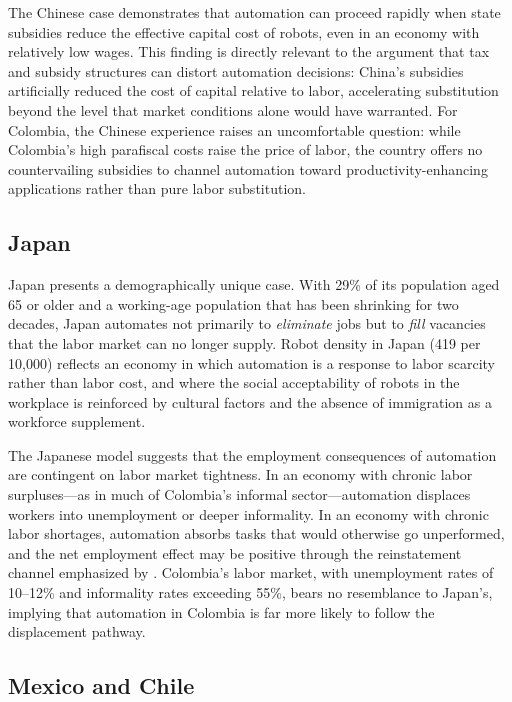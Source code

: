 \documentclass{article}
\begin{document}
The Chinese case demonstrates that automation can proceed rapidly when state subsidies reduce the effective capital cost of robots, even in an economy with relatively low wages. This finding is directly relevant to the \cite{acemoglu2020taxes} argument that tax and subsidy structures can distort automation decisions: China's subsidies artificially reduced the cost of capital relative to labor, accelerating substitution beyond the level that market conditions alone would have warranted. For Colombia, the Chinese experience raises an uncomfortable question: while Colombia's high parafiscal costs raise the price of labor, the country offers no countervailing subsidies to channel automation toward productivity-enhancing applications rather than pure labor substitution.

\subsection{Japan}
\label{subsec:japan}

Japan presents a demographically unique case. With 29\% of its population aged 65 or older and a working-age population that has been shrinking for two decades, Japan automates not primarily to \textit{eliminate} jobs but to \textit{fill} vacancies that the labor market can no longer supply. Robot density in Japan (419 per 10,000) reflects an economy in which automation is a response to labor scarcity rather than labor cost, and where the social acceptability of robots in the workplace is reinforced by cultural factors and the absence of immigration as a workforce supplement.

The Japanese model suggests that the employment consequences of automation are contingent on labor market tightness. In an economy with chronic labor surpluses---as in much of Colombia's informal sector---automation displaces workers into unemployment or deeper informality. In an economy with chronic labor shortages, automation absorbs tasks that would otherwise go unperformed, and the net employment effect may be positive through the reinstatement channel emphasized by \cite{acemoglu2019automation}. Colombia's labor market, with unemployment rates of 10--12\% and informality rates exceeding 55\%, bears no resemblance to Japan's, implying that automation in Colombia is far more likely to follow the displacement pathway.

\subsection{Mexico and Chile}
\label{subsec:mexico_chile}
\end{document}
